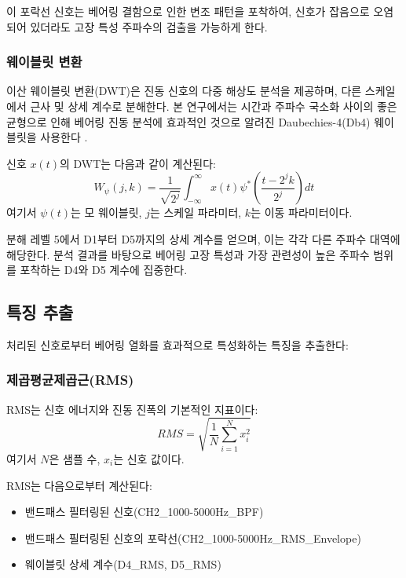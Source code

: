 \documentclass[conference,twocolumn]{IEEEtran}
\begin{document}
이 포락선 신호는 베어링 결함으로 인한 변조 패턴을 포착하여, 신호가 잡음으로 오염되어 있더라도 고장 특성 주파수의 검출을 가능하게 한다.

\subsubsection{웨이블릿 변환}

이산 웨이블릿 변환(DWT)은 진동 신호의 다중 해상도 분석을 제공하며, 다른 스케일에서 근사 및 상세 계수로 분해한다. 본 연구에서는 시간과 주파수 국소화 사이의 좋은 균형으로 인해 베어링 진동 분석에 효과적인 것으로 알려진 Daubechies-4(Db4) 웨이블릿을 사용한다 \cite{kumar2013wavelet}.

신호 $x(t)$의 DWT는 다음과 같이 계산된다:
\begin{equation}
    W_{\psi}(j, k) = \frac{1}{\sqrt{2^j}} \int_{-\infty}^{\infty} x(t) \psi^*\left(\frac{t - 2^j k}{2^j}\right) dt
\end{equation}
여기서 $\psi(t)$는 모 웨이블릿, $j$는 스케일 파라미터, $k$는 이동 파라미터이다.

분해 레벨 5에서 D1부터 D5까지의 상세 계수를 얻으며, 이는 각각 다른 주파수 대역에 해당한다. 분석 결과를 바탕으로 베어링 고장 특성과 가장 관련성이 높은 주파수 범위를 포착하는 D4와 D5 계수에 집중한다.

\subsection{특징 추출}

처리된 신호로부터 베어링 열화를 효과적으로 특성화하는 특징을 추출한다:

\subsubsection{제곱평균제곱근(RMS)}

RMS는 신호 에너지와 진동 진폭의 기본적인 지표이다:
\begin{equation}
    RMS = \sqrt{\frac{1}{N} \sum_{i=1}^{N} x_i^2}
\end{equation}
여기서 $N$은 샘플 수, $x_i$는 신호 값이다.

RMS는 다음으로부터 계산된다:
\begin{itemize}
    \item 밴드패스 필터링된 신호(CH2\_1000-5000Hz\_BPF)
    \item 밴드패스 필터링된 신호의 포락선(CH2\_1000-5000Hz\_RMS\_Envelope)
    \item 웨이블릿 상세 계수(D4\_RMS, D5\_RMS)
\end{itemize}
\end{document}
